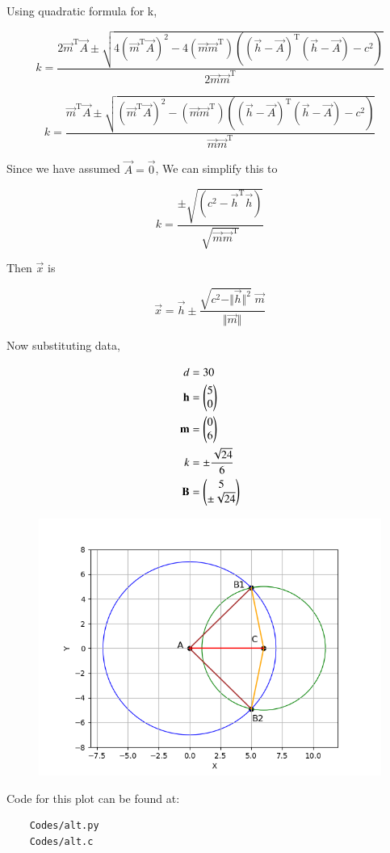 \documentclass[journal]{IEEEtran}
\begin{document}
Using quadratic formula for k,

$$k = \frac{2\vec{m}^\text{T}\vec{A} \pm \sqrt{4(\vec{m}^\text{T}\vec{A})^2 - 4 (\vec{m}\vec{m}^\text{T})((\vec{h} - \vec{A})^\text{T}(\vec{h} - \vec{A}) - c^2)}}{2\vec{m}\vec{m}^\text{T}}$$

$$k = \frac{\vec{m}^\text{T}\vec{A} \pm \sqrt{(\vec{m}^\text{T}\vec{A})^2 - (\vec{m}\vec{m}^\text{T})((\vec{h} - \vec{A})^\text{T}(\vec{h} - \vec{A}) - c^2)}}{\vec{m}\vec{m}^\text{T}}$$

Since we have assumed $\vec{A} = \vec{0}$, We can simplify this to

$$k = \frac{\pm \sqrt{(c^2 - \vec{h}^\text{T}\vec{h})}}{\sqrt{\vec{m}\vec{m}^\text{T}}}$$

Then $\vec{x}$ is

$$\vec{x} = \vec{h} \pm \frac{\sqrt{c^2 - \Vert \vec{h} \Vert^2} \; \vec{m}}{\Vert \vec{m} \Vert}$$

Now substituting data,

\begin{align*}
	d &= 30\\
	\mathbf{h} &= \begin{pmatrix}5 \\ 0\end{pmatrix}\\
	\mathbf{m} &= \begin{pmatrix}0 \\ 6\end{pmatrix}\\
	k &= \pm \frac{\sqrt{24}}{6}\\
	\mathbf{B} &= \begin{pmatrix}5 \\ \pm \sqrt{24}\end{pmatrix}
\end{align*}

\begin{figure}[H]
	\centering
	\includegraphics[width=0.75\columnwidth]{Figures/Alt_Figure.png}
	\label{fig}
\end{figure}

Code for this plot can be found at:
\begin{lstlisting}
    Codes/alt.py
    Codes/alt.c
\end{lstlisting}
\end{document}
